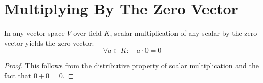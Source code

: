 \section{Multiplying By The Zero Vector}

\begin{theorem}
  \label{theorem : smul_zero}
  \leanok
  In any vector space $V$ over field $K$, scalar multiplication of any scalar by the zero vector yields the zero vector:
  $$\forall a \in K: \quad a \cdot 0 = 0$$
\end{theorem}

\begin{proof}
  This follows from the distributive property of scalar multiplication and the fact that $0 + 0 = 0$.
\end{proof}
